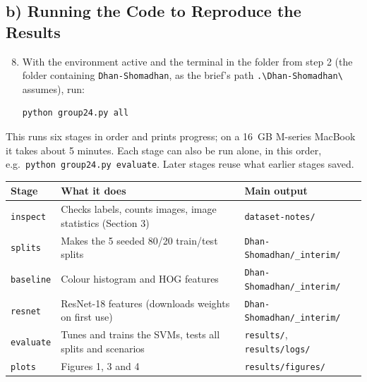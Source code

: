 \subsection*{b) Running the Code to Reproduce the Results}

\begin{enumerate}
\setcounter{enumi}{7}
\item With the environment active and the terminal in the folder from step 2
(the folder containing \texttt{Dhan-Shomadhan}, as the brief's path
\texttt{.\textbackslash Dhan-Shomadhan\textbackslash} assumes), run:
\begin{verbatim}
python group24.py all
\end{verbatim}
\end{enumerate}

\noindent This runs six stages in order and prints progress; on a 16~GB
M-series MacBook it takes about 5 minutes. Each stage can also be run alone,
in this order, e.g.\ \texttt{python group24.py evaluate}. Later stages reuse
what earlier stages saved.

\begin{center}
\small
\begin{tabular}{|l|p{6.2cm}|p{5.2cm}|}
\hline
\textbf{Stage} & \textbf{What it does} & \textbf{Main output} \\ \hline
\texttt{inspect} & Checks labels, counts images, image statistics (Section 3) & \texttt{dataset-notes/} \\ \hline
\texttt{splits} & Makes the 5 seeded 80/20 train/test splits & \texttt{Dhan-Shomadhan/\_interim/} \\ \hline
\texttt{baseline} & Colour histogram and HOG features & \texttt{Dhan-Shomadhan/\_interim/} \\ \hline
\texttt{resnet} & ResNet-18 features (downloads weights on first use) & \texttt{Dhan-Shomadhan/\_interim/} \\ \hline
\texttt{evaluate} & Tunes and trains the SVMs, tests all splits and scenarios & \texttt{results/}, \texttt{results/logs/} \\ \hline
\texttt{plots} & Figures 1, 3 and 4 & \texttt{results/figures/} \\ \hline
\end{tabular}
\end{center}

